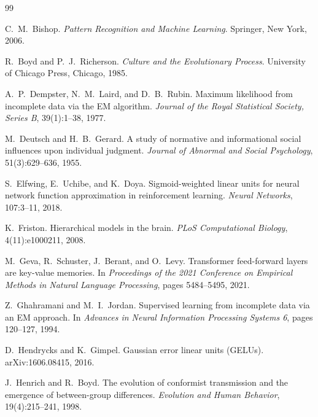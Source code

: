 \documentclass[11pt]{article}
\theoremstyle{definition}
\theoremstyle{remark}
\begin{document}
\begin{thebibliography}{99}

C.~M.~Bishop.
\newblock \emph{Pattern Recognition and Machine Learning}.
\newblock Springer, New York, 2006.

R.~Boyd and P.~J.~Richerson.
\newblock \emph{Culture and the Evolutionary Process}.
\newblock University of Chicago Press, Chicago, 1985.

A.~P.~Dempster, N.~M.~Laird, and D.~B.~Rubin.
\newblock Maximum likelihood from incomplete data via the {EM} algorithm.
\newblock \emph{Journal of the Royal Statistical Society, Series B}, 39(1):1--38, 1977.

M.~Deutsch and H.~B.~Gerard.
\newblock A study of normative and informational social influences upon individual judgment.
\newblock \emph{Journal of Abnormal and Social Psychology}, 51(3):629--636, 1955.

S.~Elfwing, E.~Uchibe, and K.~Doya.
\newblock Sigmoid-weighted linear units for neural network function approximation in reinforcement learning.
\newblock \emph{Neural Networks}, 107:3--11, 2018.

K.~Friston.
\newblock Hierarchical models in the brain.
\newblock \emph{PLoS Computational Biology}, 4(11):e1000211, 2008.

M.~Geva, R.~Schuster, J.~Berant, and O.~Levy.
\newblock Transformer feed-forward layers are key-value memories.
\newblock In \emph{Proceedings of the 2021 Conference on Empirical Methods in Natural Language Processing}, pages 5484--5495, 2021.

Z.~Ghahramani and M.~I.~Jordan.
\newblock Supervised learning from incomplete data via an {EM} approach.
\newblock In \emph{Advances in Neural Information Processing Systems 6}, pages 120--127, 1994.

D.~Hendrycks and K.~Gimpel.
\newblock Gaussian error linear units ({GELUs}).
\newblock arXiv:1606.08415, 2016.

J.~Henrich and R.~Boyd.
\newblock The evolution of conformist transmission and the emergence of between-group differences.
\newblock \emph{Evolution and Human Behavior}, 19(4):215--241, 1998.


\end{thebibliography}
\end{document}
